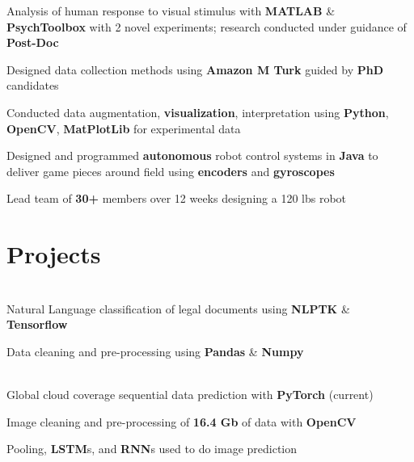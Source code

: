 \documentclass[]{chandan-cv}
\begin{document}
\begin{minipage}[t]{0.71\textwidth}
\begin{tightemize}
	\item Analysis of human response to visual stimulus with \textbf{MATLAB} \& \textbf{PsychToolbox} with 2 novel experiments; research conducted under guidance of \textbf{Post-Doc}
	\item Designed data collection methods using \textbf{Amazon M Turk} guided by \textbf{PhD} candidates
	\item Conducted data augmentation, \textbf{visualization}, interpretation using \textbf{Python}, \textbf{OpenCV}, \textbf{MatPlotLib} for experimental data
\end{tightemize}
\sectionsep

\begin{tightemize}
	\item Designed and programmed \textbf{autonomous} robot control systems in \textbf{Java} to deliver game pieces around field using \textbf{encoders} and \textbf{gyroscopes}
	\item Lead team of \textbf{30+} members over 12 weeks designing a 120 lbs robot
\end{tightemize}
\sectionsep


\section{Projects}

\descript{ }
\location{ }
\\
Natural Language classification of legal documents using \textbf{NLPTK} \& \textbf{Tensorflow}
\begin{tightemize}
        \item Data cleaning and pre-processing using \textbf{Pandas} \& \textbf{Numpy}
\end{tightemize}
\\
Global cloud coverage sequential data prediction with \textbf{PyTorch} (current)
\begin{tightemize}
        \item Image cleaning and pre-processing of \textbf{16.4 Gb} of data with \textbf{OpenCV}
        \item Pooling, \textbf{LSTM}s, and \textbf{RNN}s used to do image prediction
\end{tightemize}
\sectionsep


\end{minipage}
\end{document}
